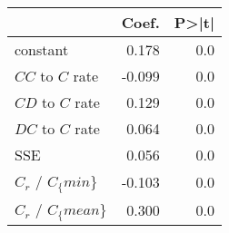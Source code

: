 \begin{tabular}{lrr}
\toprule
{} &  Coef. &  P>|t| \\
\midrule
constant           &  0.178 &    0.0 \\
$CC$ to $C$ rate   & -0.099 &    0.0 \\
$CD$ to $C$ rate   &  0.129 &    0.0 \\
$DC$ to $C$ rate   &  0.064 &    0.0 \\
SSE                &  0.056 &    0.0 \\
$C_r$ / $C_\{min\}$  & -0.103 &    0.0 \\
$C_r$ / $C_\{mean\}$ &  0.300 &    0.0 \\
\bottomrule
\end{tabular}
